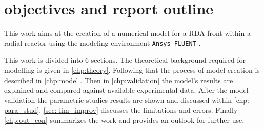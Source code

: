 \documentclass[../thesis.tex]{subfiles}
\begin{document}
\section{objectives and report outline}

This work aims at the creation of a numerical model for a RDA front within a radial reactor using the modeling environment \texttt{Ansys FLUENT} \cite{manual2009ansys}. 

This work is divided into 6 sections. The theoretical background required for modelling is given in \autoref{chp:theory}. Following that the process of model creation is described in \autoref{chp:model}. Then in \autoref{chp:validation} the model's results are explained and compared against available experimental data. After the model validation the parametric studies results are shown and discussed within \autoref{chp: para_stud}. \autoref{sec: lim_improv} discusses the limitations and errors. Finally \autoref{chp:out_con} summarizes the work and provides an outlook for further use.


\end{document}
